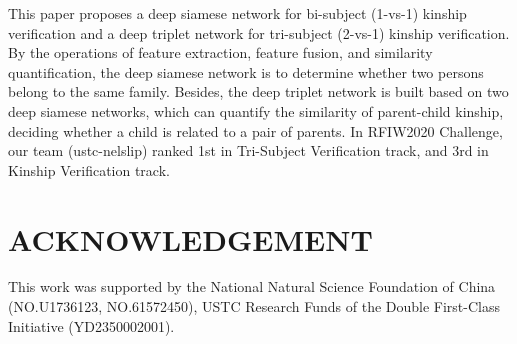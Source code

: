 \documentclass[a4paper, 10pt, conference]{ieeeconf}      %
\begin{document}
This paper proposes a deep siamese network for bi-subject (1-vs-1) kinship verification and a deep triplet network for tri-subject (2-vs-1) kinship verification. By the operations of feature extraction, feature fusion, and similarity quantification, the deep siamese network is to determine whether two persons belong to the same family. Besides, the deep triplet network is built based on two deep siamese networks, which can quantify the similarity of parent-child kinship, deciding whether a child is related to a pair of parents. In RFIW2020 Challenge, our team (ustc-nelslip) ranked 1st in Tri-Subject Verification track, and 3rd in Kinship Verification track.



\section{ACKNOWLEDGEMENT}

This work was supported by the National Natural Science Foundation of China (NO.U1736123, NO.61572450), USTC Research Funds of the Double First-Class Initiative (YD2350002001).
\end{document}
